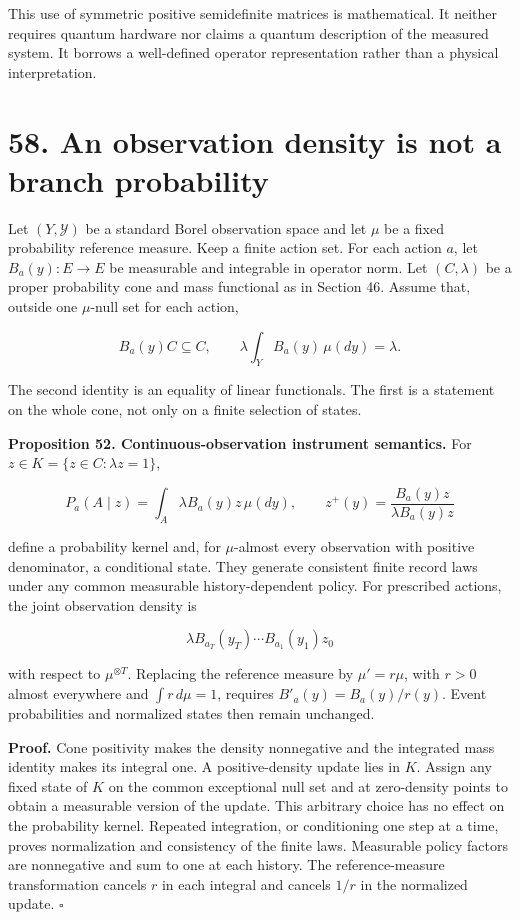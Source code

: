 \documentclass[11pt,letterpaper]{article}
\begin{document}
This use of symmetric positive semidefinite matrices is mathematical. It
neither requires quantum hardware nor claims a quantum description of
the measured system. It borrows a well-defined operator representation
rather than a physical interpretation.

\section{58. An observation density is not a branch
probability}\label{an-observation-density-is-not-a-branch-probability}

Let \((Y,\mathcal Y)\) be a standard Borel observation space and let
\(\mu\) be a fixed probability reference measure. Keep a finite action
set. For each action \(a\), let \(B_a(y):E\to E\) be measurable and
integrable in operator norm. Let \((C,\lambda)\) be a proper probability
cone and mass functional as in Section 46. Assume that, outside one
\(\mu\)-null set for each action,

\[
B_a(y)C\subseteq C,
\qquad
\lambda\int_Y B_a(y)\,\mu(dy)=\lambda.
\]

The second identity is an equality of linear functionals. The first is a
statement on the whole cone, not only on a finite selection of states.

\textbf{Proposition 52. Continuous-observation instrument semantics.}
For \(z\in K=\{z\in C:\lambda z=1\}\),

\[
\boxed{
P_a(A\mid z)=\int_A\lambda B_a(y)z\,\mu(dy),
\qquad
z^+(y)=\frac{B_a(y)z}{\lambda B_a(y)z}
}
\]

define a probability kernel and, for \(\mu\)-almost every observation
with positive denominator, a conditional state. They generate consistent
finite record laws under any common measurable history-dependent policy.
For prescribed actions, the joint observation density is

\[
\lambda B_{a_T}(y_T)\cdots B_{a_1}(y_1)z_0
\]

with respect to \(\mu^{\otimes T}\). Replacing the reference measure by
\(\mu'=r\mu\), with \(r>0\) almost everywhere and \(\int r\,d\mu=1\),
requires \(B'_a(y)=B_a(y)/r(y)\). Event probabilities and normalized
states then remain unchanged.

\textbf{Proof.} Cone positivity makes the density nonnegative and the
integrated mass identity makes its integral one. A positive-density
update lies in \(K\). Assign any fixed state of \(K\) on the common
exceptional null set and at zero-density points to obtain a measurable
version of the update. This arbitrary choice has no effect on the
probability kernel. Repeated integration, or conditioning one step at a
time, proves normalization and consistency of the finite laws.
Measurable policy factors are nonnegative and sum to one at each
history. The reference-measure transformation cancels \(r\) in each
integral and cancels \(1/r\) in the normalized update. \(\square\)
\end{document}
